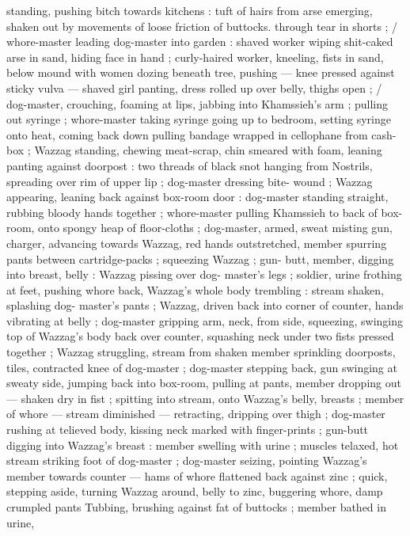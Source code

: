 standing, pushing bitch towards kitchens : tuft of hairs from arse
emerging, shaken out by movements of loose friction of buttocks.
through tear in shorts ; / whore-master leading dog-master into
garden : shaved worker wiping shit-caked arse in sand, hiding face
in hand ; curly-haired worker, kneeling, fists in sand, below mound
with women dozing beneath tree, pushing --- knee pressed against
sticky vulva --- shaved girl panting, dress rolled up over belly, thighs
open ; / dog-master, crouching, foaming at lips, jabbing into
Khamssieh’s arm ; pulling out syringe ; whore-master taking syringe
going up to bedroom, setting syringe onto heat, coming back down
pulling bandage wrapped in cellophane from cash-box ; Wazzag
standing, chewing meat-scrap, chin smeared with foam, leaning
panting against doorpost : two threads of black snot hanging from
Nostrils, spreading over rim of upper lip ; dog-master dressing bite-
wound ; Wazzag appearing, leaning back against box-room door :
dog-master standing straight, rubbing bloody hands together ;
whore-master pulling Khamssieh to back of box-room, onto spongy
heap of floor-cloths ; dog-master, armed, sweat misting gun, charger,
advancing towards Wazzag, red hands outstretched, member
spurring pants between cartridge-packs ; squeezing Wazzag ; gun-
butt, member, digging into breast, belly : Wazzag pissing over dog-
master's legs ; soldier, urine frothing at feet, pushing whore back,
Wazzag's whole body trembling : stream shaken, splashing dog-
master's pants ; Wazzag, driven back into corner of counter, hands
vibrating at belly ; dog-master gripping arm, neck, from side,
squeezing, swinging top of Wazzag's body back over counter,
squashing neck under two fists pressed together ; Wazzag
struggling, stream from shaken member sprinkling doorposts, tiles,
contracted knee of dog-master ; dog-master stepping back, gun
swinging at sweaty side, jumping back into box-room, pulling at
pants, member dropping out --- shaken dry in fist ; spitting into
stream, onto Wazzag's belly, breasts ; member of whore --- stream
diminished --- retracting, dripping over thigh ; dog-master rushing at
telieved body, kissing neck marked with finger-prints ; gun-butt
digging into Wazzag's breast : member swelling with urine ; muscles
telaxed, hot stream striking foot of dog-master ; dog-master seizing,
pointing Wazzag's member towards counter --- hams of whore
flattened back against zinc ; quick, stepping aside, turning Wazzag
around, belly to zinc, buggering whore, damp crumpled pants
Tubbing, brushing against fat of buttocks ; member bathed in urine,
